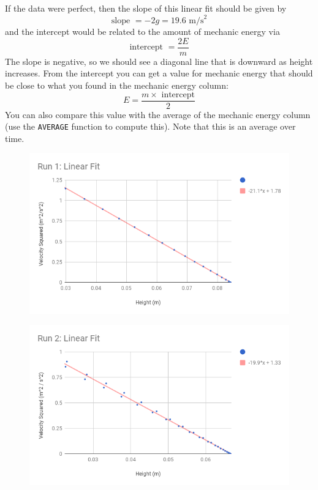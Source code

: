 If the data were perfect, then the slope of this linear fit should be given by
\begin{equation} \label{eq.07.slope}
    \text{slope } = -2g = 19.6 \text{ m/s}^{2}
\end{equation}
and the intercept would be related to the amount of mechanic energy via
\begin{equation}
    \text{intercept } = \frac{2 E}{m}
\end{equation}
The slope is negative, so we should see a diagonal line that is downward as height increases. From the intercept you can get a value for mechanic energy that should be close to what you found in the mechanic energy column:
\begin{equation} \label{eq.07.intercept}
    E = \frac{m \times \text{ intercept}}{2}
\end{equation}
You can also compare this value with the average of the mechanic energy column (use the \texttt{AVERAGE} function to compute this). Note that this is an average over time.
\begin{figure}
    \centering
    \includegraphics[scale=0.71]{image/07-mechanic/run-1-fit.png}
    \caption{}
    \label{figure.07.run.1.fit}
\end{figure}
\begin{figure}
    \centering
    \includegraphics[scale=0.71]{image/07-mechanic/run-2-fit.png}
    \caption{}
    \label{figure.07.run.2.fit}
\end{figure}

